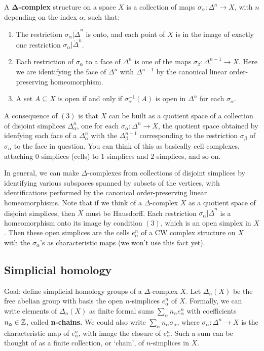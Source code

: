 A $\mathbf{\Delta }$\textbf{-complex} structure on a space $X$ is a collection of maps $\sigma_{\alpha } \colon \Delta ^n  \to X$, with $n$ depending on the index $\alpha $, such that:
\begin{enumerate}
    \item The restriction $\sigma_{\alpha }|\mathring{\Delta }^n $ is onto, and each point of $X$ is in the image of exactly one restriction $\sigma_{\alpha }|\mathring{\Delta }^n $.
    \item Each restriction of $\sigma_{\alpha }$ to a face of $\Delta ^n $ is one of the maps $\sigma_{\beta } \colon \Delta ^{n-1} \to X$. Here we are identifying the face of $\Delta ^n $ with $\Delta ^{n-1}$ by the canonical linear order-preserving homeomorphism.
    \item A set $A\subseteq X$ is open if and only if $\sigma_{\alpha }^{-1}(A)$ is open in $\Delta ^n $ for each $\sigma_{\alpha }$.
\end{enumerate}
A consequence of $(3)$ is that $X$ can be built as a quotient space of a collection of disjoint simplices $\Delta _{\alpha }^n $, one for each $\sigma_{\alpha } \colon \Delta ^n  \to X$, the quotient space obtained by idenfying each face of a $\Delta _{\alpha }^n $ with the $\Delta _{\beta }^{n-1}$ corresponding to the restriction $\sigma_{\beta }$ of $\sigma_{\alpha }$ to the face in question. You can think of this as basically cell complexes, attaching $0$-simplices (cells) to $1$-simplices and $2$-simplices, and so on. 

In general, we can make $\Delta $-complexes from collections of disjoint simplices by identifying various subspaces spanned by subsets of the vertices, with identifications performed by the canonical order-preserving linear homeomorphisms. Note that if we think of a $\Delta $-complex $X$ as a quotient space of disjoint simplices, then $X$ must be Hausdorff. Each restriction $\left.\sigma_{\alpha }  \right| \mathring{\Delta }^n $ is a homeomorphism onto its image by condition $(3)$, which is an open simplex in $X$. Then these open simplices are the cells $e_{\alpha }^n $ of a CW complex structure on $X$ with the $\sigma_{\alpha }$'s as characteristic maps (we won't use this fact yet).

\subsection{Simplicial homology}
Goal: define simplicial homology groups of a $\Delta $-complex $X$. Let $\Delta _n (X)$ be the free abelian group with basis the open $n$-simplices $e_{\alpha }^n $ of $X$. Formally, we can write elements of $\Delta _n (X)$ as finite formal sums $\sum_{\alpha }^{} n_{\alpha }e_{\alpha }^n $ with coefficients $n_{\alpha }\in \mathbb{Z}$, called \textbf{n-chains.} We could also write $\sum_{\alpha }^{} n_{\alpha }\sigma_{\alpha }$, where $\sigma_{\alpha }\colon \Delta ^n  \to X$ is the characteristic map of $e_{\alpha }^n $, with image the closure of $e_{\alpha }^n $. Such a sum can be thought of as a finite collection, or `chain', of $n$-simplices in $X$.

